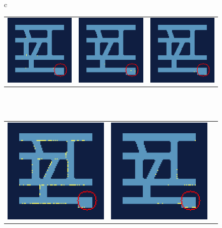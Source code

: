 \begin{figure} [htp]
\begin{center}
\begin{tabular}{c}
\begin{tabular}{ccc}
                \includegraphics[width=0.26\columnwidth]{figures/evaluation/algorithms/training_example/acktr/18_k.png} &
                \includegraphics[width=0.26\columnwidth]{figures/evaluation/algorithms/training_example/acktr/25_k.png} & 
                \includegraphics[width=0.26\columnwidth]{figures/evaluation/algorithms/training_example/acktr/29_k.png} \\
            \end{tabular} \\
             \\
            \addlinespace[0.5cm]
            \begin{tabular}{ccc}
                \includegraphics[width=0.26\columnwidth]{figures/evaluation/algorithms/training_example/acktr/30_k.png} & 
                \includegraphics[width=0.26\columnwidth]{figures/evaluation/algorithms/training_example/acktr/37_k.png} & 

\end{tabular}
\end{tabular}
\end{center}
\end{figure}

